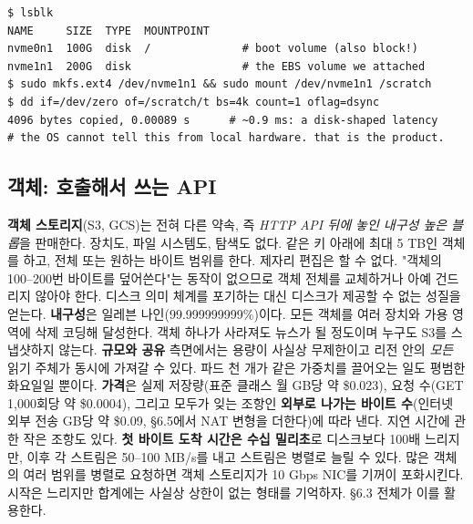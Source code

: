 \begin{terminalbox}
\begin{Verbatim}[breaklines=true,breakanywhere=true,fontsize=\small,formatcom=\color{tbbtermfg},codes=\tbbcodeactive]
$ lsblk
NAME     SIZE  TYPE  MOUNTPOINT
nvme0n1  100G  disk  /              # boot volume (also block!)
nvme1n1  200G  disk                 # the EBS volume we attached
$ sudo mkfs.ext4 /dev/nvme1n1 && sudo mount /dev/nvme1n1 /scratch
$ dd if=/dev/zero of=/scratch/t bs=4k count=1 oflag=dsync
4096 bytes copied, 0.00089 s      # ~0.9 ms: a disk-shaped latency
# the OS cannot tell this from local hardware. that is the product.
\end{Verbatim}
\end{terminalbox}

\subsection*{객체: 호출해서 쓰는 API}

\textbf{객체 스토리지}(S3, GCS)는 전혀 다른 약속, 즉 \textit{HTTP API 뒤에 놓인 내구성 높은 블롭}을 판매한다. 장치도, 파일 시스템도, 탐색도 없다.  같은 키 아래에 최대 5 TB인 객체를 하고, 전체 또는 원하는 바이트 범위를 한다. 제자리 편집은 할 수 없다. "객체의 100–200번 바이트를 덮어쓴다"는 동작이 없으므로 객체 전체를 교체하거나 아예 건드리지 않아야 한다. 디스크 의미 체계를 포기하는 대신 디스크가 제공할 수 없는 성질을 얻는다. \textbf{내구성}은 일레븐 나인(99.999999999\%)이다. 모든 객체를 여러 장치와 가용 영역에 삭제 코딩해 달성한다. 객체 하나가 사라져도 뉴스가 될 정도이며 누구도 S3를 스냅샷하지 않는다. \textbf{규모와 공유} 측면에서는 용량이 사실상 무제한이고 리전 안의 \textit{모든} 읽기 주체가 동시에 가져갈 수 있다. 파드 천 개가 같은 가중치를 끌어오는 일도 평범한 화요일일 뿐이다. \textbf{가격}은 실제 저장량(표준 클래스 월 GB당 약 \$0.023), 요청 수(GET 1,000회당 약 \$0.0004), 그리고 모두가 잊는 조항인 \textbf{외부로 나가는 바이트 수}(인터넷 외부 전송 GB당 약 \$0.09, §6.5에서 NAT 변형을 더한다)에 따라 낸다. 지연 시간에 관한 작은 조항도 있다. \textbf{첫 바이트 도착 시간은 수십 밀리초}로 디스크보다 100배 느리지만, 이후 각 스트림은 50–100 MB/s를 내고 스트림은 병렬로 늘릴 수 있다. 많은 객체의 여러 범위를 병렬로 요청하면 객체 스토리지가 10 Gbps NIC를 기꺼이 포화시킨다. 시작은 느리지만 합계에는 사실상 상한이 없는 형태를 기억하자. §6.3 전체가 이를 활용한다.

